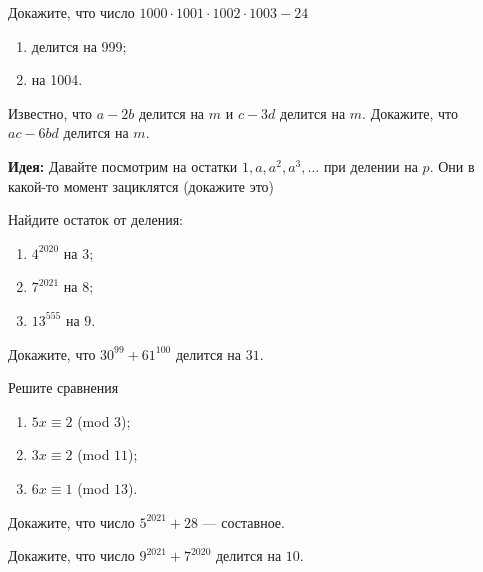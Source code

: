 \documentclass{article}
\begin{document}
    \begin{enumerate_boxed}

        \item Докажите, что число $1000 \cdot 1001 \cdot 1002 \cdot 1003 - 24$
        \begin{enumerate}
            \item делится на 999;

            \item на 1004.
        \end{enumerate}

        \item Известно, что $a - 2b$ делится на $m$ и $c - 3d$ делится на $m$.
        Докажите, что $ac - 6bd$
        делится на $m$.

        \textbf{Идея:} Давайте посмотрим на остатки $1, a, a^2, a^3, \dotsc$ при делении на $p$.
        Они в какой-то момент зациклятся (докажите это)

        \item Найдите остаток от деления:
        \begin{enumerate}
            \item $4^{2020}$ на $3$;

            \item $7^{2021}$ на $8$;

            \item $13^{555}$ на $9$.
        \end{enumerate}

        \item Докажите, что $30^{99} + 61^{100}$ делится на $31$.

        \item Решите сравнения

        \begin{enumerate}
            \item $5x \equiv 2$ (mod $3$);

            \item $3x \equiv 2$ (mod $11$);

            \item $6x \equiv 1$ (mod $13$).
        \end{enumerate}

        \item Докажите, что число $5^{2021} + 28$ — составное.

        \item Докажите, что число $9^{2021} + 7^{2020}$ делится на $10$.


\end{enumerate_boxed}
\end{document}
